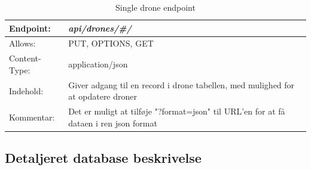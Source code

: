 \begin{table}[H]
\begin{tabular}{| p{3cm}| p{11.5cm}|}
\hline
Endpoint:	 							&\textbf{\textit{api/drones/\#/}}\\\hline
Allows:									& PUT, OPTIONS, GET\\\hline
Content-Type:						& application/json\\\hline 
Indehold:								& Giver adgang til en record i drone tabellen, med mulighed for at opdatere droner\\\hline 
Kommentar:							& Det er muligt at tilføje "?format=json" til URL'en for at få dataen i ren json format\\\hline
\end{tabular}
\caption{Single drone endpoint}
\label{single_drone_endpoint}
\end{table}

\newpage
\subsection{Detaljeret database beskrivelse}


\newpage

\newpage

\newpage

\newpage


